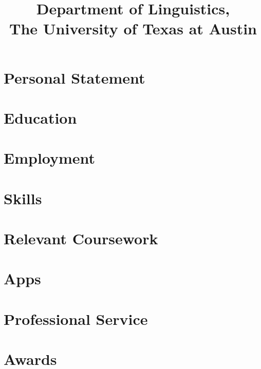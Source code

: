 \documentclass[letterpaper]{practical-resume}
\title{Department of Linguistics,\\The University of Texas at Austin}
\begin{document}
\makecvtitle

\section{Personal Statement}


\section{Education}


\section{Employment}


\printbibliography[title=Select Publications]

\section{Skills}


\section{Relevant Coursework}


\section{Apps}


\section{Professional Service}


\section{Awards}

\end{document}
